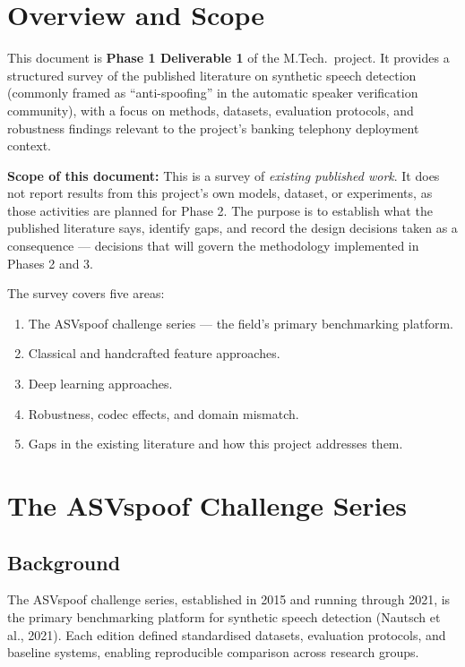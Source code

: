 \documentclass[12pt,a4paper]{article}
\begin{document}
\section{Overview and Scope}

This document is \textbf{Phase 1 Deliverable 1} of the M.Tech.\ project. It provides a
structured survey of the published literature on synthetic speech detection (commonly
framed as ``anti-spoofing'' in the automatic speaker verification community), with a focus
on methods, datasets, evaluation protocols, and robustness findings relevant to the
project's banking telephony deployment context.

\textbf{Scope of this document:} This is a survey of \emph{existing published work}. It
does not report results from this project's own models, dataset, or experiments, as those
activities are planned for Phase 2. The purpose is to establish what the published literature
says, identify gaps, and record the design decisions taken as a consequence --- decisions
that will govern the methodology implemented in Phases 2 and 3.

The survey covers five areas:
\begin{enumerate}
  \item The ASVspoof challenge series --- the field's primary benchmarking platform.
  \item Classical and handcrafted feature approaches.
  \item Deep learning approaches.
  \item Robustness, codec effects, and domain mismatch.
  \item Gaps in the existing literature and how this project addresses them.
\end{enumerate}

\section{The ASVspoof Challenge Series}

\subsection{Background}

The ASVspoof challenge series, established in 2015 and running through 2021, is the
primary benchmarking platform for synthetic speech detection (Nautsch et al., 2021). Each
edition defined standardised datasets, evaluation protocols, and baseline systems, enabling
reproducible comparison across research groups.
\end{document}
